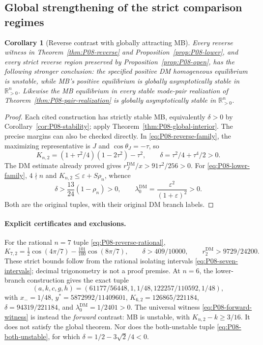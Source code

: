 \documentclass[11pt]{article}
\newcommand{\R}{\mathbb{R}}
\newcommand{\DM}{\mathrm{DM}}
\newcommand{\PosOrth}{\R_{>0}^{n}}
\newtheorem{corollary}[theorem]{Corollary}
\theoremstyle{definition}
\theoremstyle{remark}
\begin{document}
\subsection{Global strengthening of the strict comparison regimes}
\begin{corollary}[Reverse contrast with globally attracting MB]
\label{cor:P08-global-contrast}
Every reverse witness in Theorem~\ref{thm:P08-reverse} and
Proposition~\ref{prop:P08-lower}, and every strict reverse region
preserved by Proposition~\ref{prop:P08-open}, has the following stronger
conclusion: the specified positive DM homogeneous equilibrium is
unstable, while MB's positive equilibrium is globally asymptotically
stable in $\PosOrth$. Likewise the MB equilibrium in every stable
mode-pair realization of Theorem~\ref{thm:P08-pair-realization} is
globally asymptotically stable in $\PosOrth$.
\end{corollary}
\begin{proof}
Each cited construction has strictly stable MB, equivalently
$\delta>0$ by Corollary~\ref{cor:P08-stability}; apply
Theorem~\ref{thm:P08-global-interior}. The precise margins can also
be checked directly. In \eqref{eq:P08-reverse-family}, the maximizing
representative is $J$ and $\cos\theta_J=-\tau$, so
\[
 K_{n,2}=(1+\tau^2/4)(1-2\tau^2)-\tau^2,\qquad
 \delta=\tau^2/4+\tau^4/2>0.
\]
The DM estimate already proved gives $r_J^{\DM}/x>91\tau^2/256>0$.
For \eqref{eq:P08-lower-family}, $4\nmid n$ and
$K_{n,2}\le\varepsilon+S\rho_n$, whence
\[
 \delta>\frac{13}{24}(1-\rho_n)>0,\qquad
 \lambda_0^{\DM}=\frac{\varepsilon^2}{(1+\varepsilon)^2}>0.
\]
Both are the original tuples, with their original DM branch labels.
\end{proof}

\paragraph{Explicit certificates and exclusions.}
For the rational $n=7$ tuple \eqref{eq:P08-reverse-rational},
\[
 K_{7,2}=\tfrac12\cos(4\pi/7)-\tfrac{101}{100}\cos(8\pi/7),
 \qquad \delta>409/10000,\qquad r_2^{\DM}>9729/24200.
\]
These strict bounds follow from the rational isolating intervals
\eqref{eq:P08-seven-intervals}; decimal trigonometry is not a proof premise.
At $n=6$, the lower-branch construction gives the exact tuple
\[
 (a,k,c,g,h)=(61177/56448,1,1/48,122257/110592,1/48),
\]
with $x_-=1/48$, $y^*=5872992/11409601$,
$K_{6,2}=126865/221184$, $\delta=94319/221184$, and
$\lambda_0^{\DM}=1/2401>0$.
The universal witness \eqref{eq:P08-forward-witness} is instead the
\emph{forward} contrast: MB is unstable, with $K_{n,2}-k\ge3/16$.
It does not satisfy the global theorem. Nor does the both-unstable
tuple \eqref{eq:P08-both-unstable}, for which
$\delta=1/2-3\sqrt2/4<0$.
\end{document}
